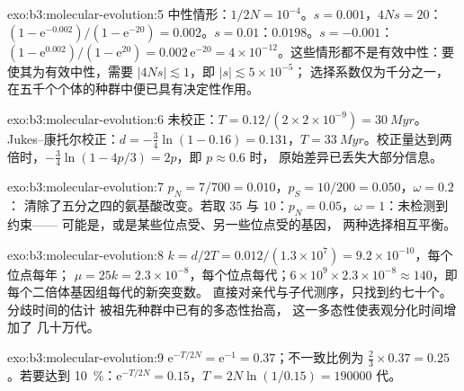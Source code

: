 \begin{solution}{exo:b3:molecular-evolution:5}
中性情形：$1/2N = 10^{-4}$。$s = 0.001$，$4Ns = 20$：$(1 - \mathrm{e}^{-0.002})/
(1 - \mathrm{e}^{-20}) = 0.002$。$s = 0.01$：$0.0198$。$s = -0.001$：$(1 -
\mathrm{e}^{0.002})/(1 - \mathrm{e}^{20}) = 0.002\,\mathrm{e}^{-20} =
4\times 10^{-12}$。这些情形都不是有效中性：要使其为有效中性，需要 $|4Ns|
\lesssim 1$，即 $|s| \lesssim 5\times 10^{-5}$；
选择系数仅为千分之一，
在五千个个体的种群中便已具有决定性作用。
\end{solution}

\begin{solution}{exo:b3:molecular-evolution:6}
未校正：$T = 0.12/(2\times 2\times 10^{-9}) = \qty{30}{Myr}$。
Jukes--康托尔校正：$d = -\tfrac{3}{4}\ln(1 - 0.16) = 0.131$，$T =
\qty{33}{Myr}$。校正量达到两倍时，$-\tfrac{3}{4}
\ln(1 - 4p/3) = 2p$，即 $p \approx 0.6$ 时，
原始差异已丢失大部分信息。
\end{solution}

\begin{solution}{exo:b3:molecular-evolution:7}
$p_{N} = 7/700 = 0.010$，$p_{S} = 10/200 = 0.050$，$\omega = 0.2$：
清除了五分之四的氨基酸改变。若取
$35$ 与 $10$：$p_{N} = 0.05$，$\omega = 1$：未检测到约束——
可能是，或是某些位点受、另一些位点受的基因，
两种选择相互平衡。
\end{solution}

\begin{solution}{exo:b3:molecular-evolution:8}
$k = d/2T = 0.012/(1.3\times 10^{7}) = 9.2\times 10^{-10}$，每个位点每年；
$\mu = 25k = 2.3\times 10^{-8}$，每个位点每代；$6\times
10^{9}\times 2.3\times 10^{-8} \approx 140$，即每个二倍体基因组每代的新突变数。
直接对亲代与子代测序，只找到约七十个。分歧时间的估计
被祖先种群中已有的多态性抬高，
这一多态性使表观分化时间增加了
几十万代。
\end{solution}

\begin{solution}{exo:b3:molecular-evolution:9}
$\mathrm{e}^{-T/2N} = \mathrm{e}^{-1} = 0.37$；不一致比例为 $\tfrac{2}{3}
\times 0.37 = 0.25$。若要达到 \qty{10}{\%}：$\mathrm{e}^{-T/2N} = 0.15$，$T =
2N\ln(1/0.15) = \num{190000}$ 代。
\end{solution}

